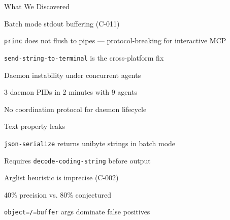 \documentclass[presentation]{beamer}
\begin{document}
\begin{frame}[label={sec:orgbe1f949},fragile]{What We Discovered}
 \begin{block}{Batch mode stdout buffering (C-011)}
\begin{block}{\texttt{princ} does not flush to pipes --- protocol-breaking for interactive MCP}
\end{block}
\begin{block}{\texttt{send-string-to-terminal} is the cross-platform fix}
\end{block}
\end{block}
\begin{block}{Daemon instability under concurrent agents}
\begin{block}{3 daemon PIDs in 2 minutes with 9 agents}
\end{block}
\begin{block}{No coordination protocol for daemon lifecycle}
\end{block}
\end{block}
\begin{block}{Text property leaks}
\begin{block}{\texttt{json-serialize} returns unibyte strings in batch mode}
\end{block}
\begin{block}{Requires \texttt{decode-coding-string} before output}
\end{block}
\end{block}
\begin{block}{Arglist heuristic is imprecise (C-002)}
\begin{block}{40\% precision vs. 80\% conjectured}
\end{block}
\begin{block}{\texttt{object=/=buffer} args dominate false positives}
\end{block}
\end{block}
\end{frame}
\end{document}
